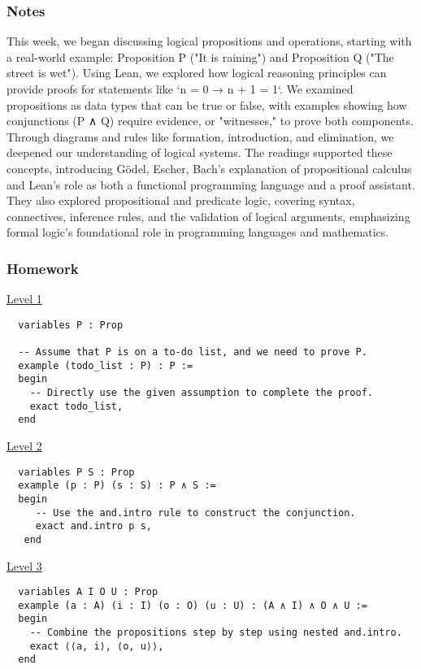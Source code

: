 \documentclass{article}
\theoremstyle{theorem}
\theoremstyle{definition}
\theoremstyle{remark}
\begin{document}
\subsubsection*{Notes}
This week, we began discussing logical propositions and operations, starting with a real-world example: Proposition P ("It is raining") and Proposition Q ("The street is wet"). Using Lean, we explored how logical reasoning principles can provide proofs for statements like `n = 0 → n + 1 = 1`. We examined propositions as data types that can be true or false, with examples showing how conjunctions (P ∧ Q) require evidence, or "witnesses," to prove both components. Through diagrams and rules like formation, introduction, and elimination, we deepened our understanding of logical systems. The readings supported these concepts, introducing Gödel, Escher, Bach's explanation of propositional calculus and Lean's role as both a functional programming language and a proof assistant. They also explored propositional and predicate logic, covering syntax, connectives, inference rules, and the validation of logical arguments, emphasizing formal logic's foundational role in programming languages and mathematics.

\subsubsection*{Homework}

\medskip\noindent\centerline{\underline{Level 1}}
\begin{verbatim}
  variables P : Prop

  -- Assume that P is on a to-do list, and we need to prove P.
  example (todo_list : P) : P :=
  begin
    -- Directly use the given assumption to complete the proof.
    exact todo_list,
  end
\end{verbatim}

\medskip\noindent\centerline{\underline{Level 2}}

\begin{verbatim}
  variables P S : Prop
  example (p : P) (s : S) : P ∧ S :=
  begin
     -- Use the and.intro rule to construct the conjunction.
     exact and.intro p s,
   end
\end{verbatim}

\medskip\noindent\centerline{\underline{Level 3}}

\begin{verbatim}
  variables A I O U : Prop
  example (a : A) (i : I) (o : O) (u : U) : (A ∧ I) ∧ O ∧ U :=
  begin
    -- Combine the propositions step by step using nested and.intro.
    exact ⟨⟨a, i⟩, ⟨o, u⟩⟩,
  end
\end{verbatim}
\end{document}

